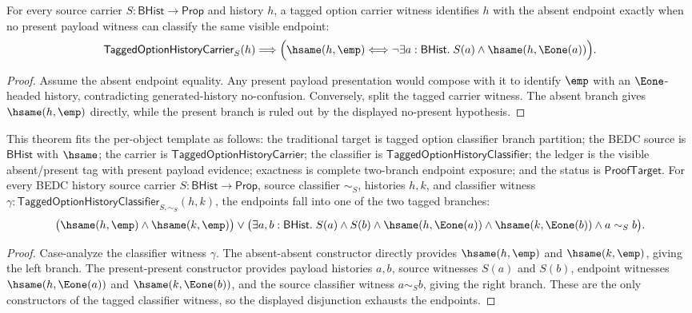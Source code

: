 \begin{theorem}
\label{thm:tagged-option-history-carrier-absent-no-present-iff}
For every source carrier $S:\mathsf{BHist}\to\mathsf{Prop}$ and history $h$,
a tagged option carrier witness identifies $h$ with the absent endpoint exactly
when no present payload witness can classify the same visible endpoint:
$$
\mathsf{TaggedOptionHistoryCarrier}_S(h)
\Longrightarrow
\Bigl(
\hsame(h,\emp)
\Longleftrightarrow
\neg\exists a:\mathsf{BHist}.\;S(a)\land\hsame(h,\Eone(a))
\Bigr).
$$
\end{theorem}
\begin{proof}
Assume the absent endpoint equality. Any present payload presentation would
compose with it to identify $\emp$ with an $\Eone$-headed history, contradicting
generated-history no-confusion. Conversely, split the tagged carrier witness.
The absent branch gives $\hsame(h,\emp)$ directly, while the present branch is
ruled out by the displayed no-present hypothesis.
\end{proof}

\begin{theorem}
\label{thm:tagged-option-history-classifier-branch-partition}
This theorem fits the per-object template as follows: the traditional target is
tagged option classifier branch partition; the BEDC source is $\mathsf{BHist}$
with $\hsame$; the carrier is $\mathsf{TaggedOptionHistoryCarrier}$; the
classifier is $\mathsf{TaggedOptionHistoryClassifier}$; the ledger is the
visible absent/present tag with present payload evidence; exactness is complete
two-branch endpoint exposure; and the status is $\mathsf{ProofTarget}$. For
every BEDC history source carrier $S:\mathsf{BHist}\to\mathsf{Prop}$, source
classifier $\sim_S$, histories $h,k$, and classifier witness
$\gamma:\mathsf{TaggedOptionHistoryClassifier}_{S,\sim_S}(h,k)$, the endpoints
fall into one of the two tagged branches:
$$
\bigl(\hsame(h,\emp)\land\hsame(k,\emp)\bigr)
\lor
\bigl(\exists a,b:\mathsf{BHist}.\;
S(a)\land S(b)\land
\hsame(h,\Eone(a))\land \hsame(k,\Eone(b))\land a\sim_S b\bigr).
$$
\end{theorem}
\begin{proof}
Case-analyze the classifier witness $\gamma$. The absent-absent constructor
directly provides $\hsame(h,\emp)$ and $\hsame(k,\emp)$, giving the left branch.
The present-present constructor provides payload histories $a,b$, source
witnesses $S(a)$ and $S(b)$, endpoint witnesses $\hsame(h,\Eone(a))$ and
$\hsame(k,\Eone(b))$, and the source classifier witness $a\sim_S b$, giving the
right branch. These are the only constructors of the tagged classifier witness,
so the displayed disjunction exhausts the endpoints.
\end{proof}

